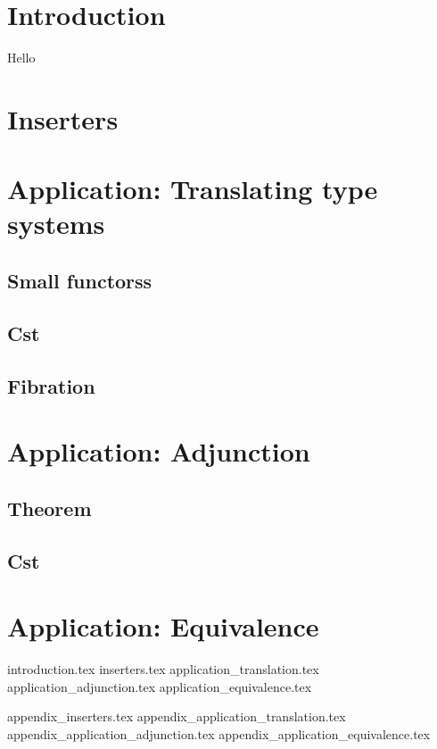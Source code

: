 \documentclass[acmsmall,anonymous,screen,review]{acmart}
\theoremstyle{acmdefinition}
\begin{document}



\maketitle

\section{Introduction}
Hello \cite{Adamek}
\section{Inserters}
\section{Application: Translating type systems}
\subsection{Small functorss}
\subsection{Cst}
\subsection{Fibration}
\section{Application: Adjunction}
\subsection{Theorem}
\subsection{Cst}
\section{Application: Equivalence}


\newpage

{introduction.tex}
{inserters.tex}
{application_translation.tex}
{application_adjunction.tex}
{application_equivalence.tex}




\appendix
{appendix_inserters.tex}
{appendix_application_translation.tex}
{appendix_application_adjunction.tex}
{appendix_application_equivalence.tex}
\end{document}
